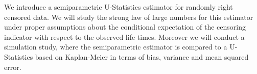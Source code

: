 \documentclass[phd]{UWMThesis}
\renewcommand{\.}{\textrm{ .}}
\theoremstyle{definition}
\numberwithin{thm}{chapter}
\newcommand{\todo}{\TODO}
\begin{document}
	
	
	\ThesisFrontmatter
	
	
	\ThesisTitlepage
	
	
	\begin{ThesisAbstract}
		We introduce a semiparametric U-Statistics estimator for randomly right censored data. We will study the strong law of large numbers for this estimator under proper assumptions about the conditional expectation of the censoring indicator with respect to the observed life times. Moreover we will conduct a simulation study, where the semiparametric estimator is compared to a U-Statistics based on Kaplan-Meier in terms of bias, variance and mean squared error.
		
	\end{ThesisAbstract}
	
	
	
	
	
	
\end{document}
